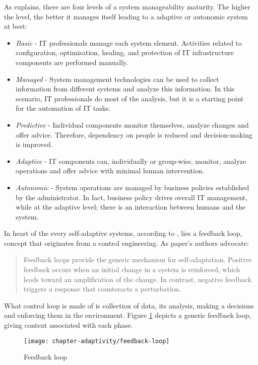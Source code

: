 As  \cite{murch2004autonomic} explains, there are four levels of a system manageability maturity. The higher the level, the better it manages itself leading to a adaptive or autonomic system at best:
\begin{itemize}
 \item \emph{Basic} - IT professionals manage each system element. Activities related to configuration, optimisation, healing, and protection of IT infrastructure components are performed manually.
 \item \emph{Managed} - System management technologies can be used to collect information from different systems and analyze this information. In this scenario, IT professionals do most of the analysis, but it is a starting point for the automation of IT tasks.
 \item \emph{Predictive} - Individual components monitor themselves, analyze changes and offer advice. Therefore, dependency on people is reduced and decision-making is improved.
 \item \emph{Adaptive} - IT components can, individually or group-wise, monitor, analyze operations and offer advice with minimal human intervention.
 \item \emph{Autonomic} - System operations are managed by business policies established by the administrator. In fact, business policy drives overall IT management, while at the adaptive level; there is an interaction between humans and the system.
\end{itemize}

In heart of the every self-adaptive systems, according to \cite{brun2009engineering}, lies a feedback loop, concept that originates from a control engineering. As paper's authors advocate:
\begin{quote}
Feedback loops provide the generic mechanism for self-adaptation. Positive feedback occurs when an initial change in a system is reinforced, which leads toward an amplification of the change. In contrast, negative feedback triggers a response that counteracts a perturbation. 
\end{quote}

What control loop is made of is collection of data, its analysis, making a decisions and enforcing them in the environment. Figure \ref{fig:feedback-loop} depicts a generic feedback loop, giving context associated with each phase.

\begin{figure}[!ht]
  \begin{center}
    \texttt{[image: chapter-adaptivity/feedback-loop]}
  \end{center}
  \caption{Feedback loop \cite{brun2009engineering}}
  \label{fig:feedback-loop}
\end{figure}

